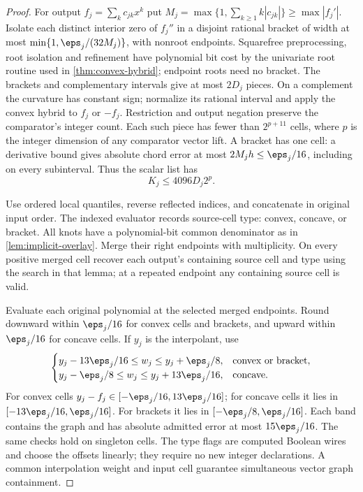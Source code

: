 \begin{proof}
For output $f_j=\sum_kc_{jk}x^k$ put
$M_j=\max\{1,\sum_{k\ge1}k|c_{jk}|\}\ge\max|f_j'|$.
Isolate each distinct interior zero of $f_j''$ in a disjoint rational
bracket of width at most $\min\{1,\eps_j/(32M_j)\}$, with nonroot
endpoints. Squarefree preprocessing, root isolation and refinement have
polynomial bit cost by the univariate root routine used in
\cref{thm:convex-hybrid}; endpoint roots need no bracket.
The brackets and complementary intervals give at most $2D_j$ pieces.
On a complement the curvature has constant sign; normalize its rational
interval and apply the convex hybrid to $f_j$ or $-f_j$.
Restriction and output negation preserve the comparator's integer count.
Each such piece has fewer than $2^{p+11}$ cells, where $p$ is the
integer dimension of any comparator vector lift. A bracket has one cell:
a derivative bound gives absolute chord error at most
$2M_jh\le\eps_j/16$, including on every subinterval.
Thus the scalar list has
\begin{equation}\label{eq:arbitrary-scalar-cells}
 K_j\le4096D_j2^p.
\end{equation}

Use ordered local quantiles, reverse reflected indices, and concatenate
in original input order. The indexed evaluator records source-cell type:
convex, concave, or bracket. All knots have a polynomial-bit common
denominator as in \cref{lem:implicit-overlay}. Merge their right
endpoints with multiplicity. On every positive merged cell recover each
output's containing source cell and type using the search in that lemma;
at a repeated endpoint any containing source cell is valid.

Evaluate each original polynomial at the selected merged endpoints.
Round downward within $\eps_j/16$ for convex cells and brackets,
and upward within $\eps_j/16$ for concave cells. If $y_j$ is the
interpolant, use
\begin{equation}\label{eq:signed-overlay-bands}
 \begin{cases}
 y_j-13\eps_j/16\le w_j\le y_j+\eps_j/8,
       &\text{convex or bracket},\\
 y_j-\eps_j/8\le w_j\le y_j+13\eps_j/16,
       &\text{concave}.
 \end{cases}
\end{equation}
For convex cells $y_j-f_j\in[-\eps_j/16,13\eps_j/16]$;
for concave cells it lies in $[-13\eps_j/16,\eps_j/16]$.
For brackets it lies in $[-\eps_j/8,\eps_j/16]$.
Each band contains the graph and has absolute admitted error at most
$15\eps_j/16$. The same checks hold on singleton cells. The type
flags are computed Boolean wires and choose the offsets linearly;
they require no new integer declarations. A common interpolation weight
and input cell guarantee simultaneous vector graph containment.


\end{proof}

